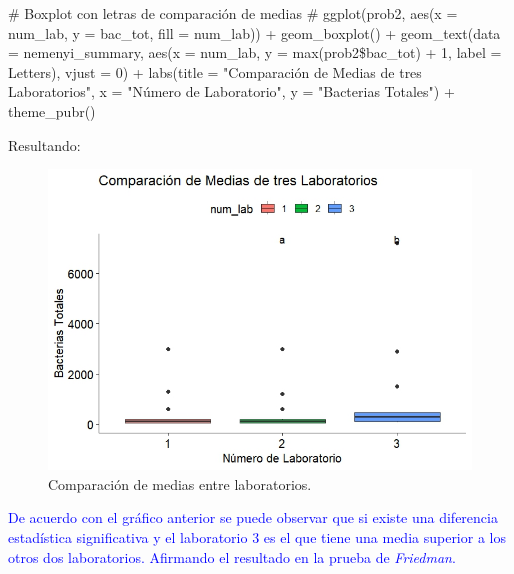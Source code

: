 \documentclass[a4paper,12pt]{article}
\begin{document}
\begin{enumerate} [label=\textbf{\alph*})]
\begin{MyVerbatim}
	# Boxplot con letras de comparación de medias #
ggplot(prob2, aes(x = num\_lab, y = bac\_tot, fill = num\_lab)) +
geom\_boxplot() +
geom\_text(data = nemenyi\_summary, 
aes(x = num\_lab, y = max(prob2\$bac\_tot) + 1, label = Letters),
vjust = 0) +
labs(title = "Comparación de Medias de tres Laboratorios",
x = "Número de Laboratorio",
y = "Bacterias Totales") +
theme\_pubr()
	\end{MyVerbatim}
Resultando:
\begin{figure}[H]
	\centering
	\includegraphics[width=0.7\linewidth]{Med_prob2}
	\caption[boxmedias]{Comparación de medias entre laboratorios.}
	\label{fig:medprob2}
\end{figure}
\textcolor{blue}{De acuerdo con el gráfico anterior se puede observar que si existe una diferencia estadística significativa y el laboratorio 3 es el que tiene una media superior a los otros dos laboratorios. Afirmando el resultado en la prueba de \textit{Friedman}.}
\end{enumerate}
	
\newpage
\end{document}
